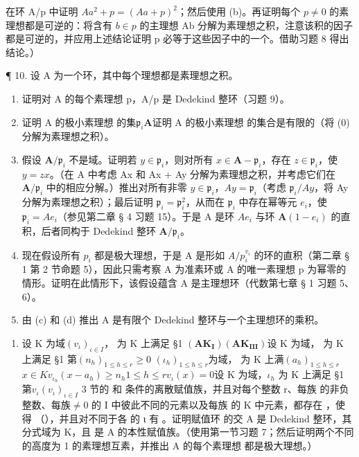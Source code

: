 在环 A/p 中证明 \(Aa^{2} + p = (Aa + p)^{2}\)；然后使用 (b)。再证明每个 \(p \neq 0\) 的素理想都是可逆的：将含有 \(b \in p\) 的主理想 Ab 分解为素理想之积，注意该积的因子都是可逆的，并应用上述结论证明 p 必等于这些因子中的一个。借助习题 8 得出结论。）

¶ 10. 设 A 为一个环，其中每个理想都是素理想之积。

\begin{enumerate}
\def\labelenumi{(\alph{enumi})}
\item
  证明对 A 的每个素理想 p，A/p 是 Dedekind 整环（习题 9）。
\item
  证明 A 的极小素理想  的集\(\mathfrak{p}_i\)\(\mathbf{A}\)证明 A 的极小素理想  的集合是有限的（将 (0) 分解为素理想之积）。
\item
  假设 \(\mathbf{A} / \mathfrak{p}_i\) 不是域。证明若 \(y \in \mathfrak{p}_i\)，则对所有 \(x \in \mathbf{A} - \mathfrak{p}_i\)，存在 \(z \in \mathfrak{p}_i\)，使 \(y = zx\)。（在 A 中考虑 Ax 和 Ax + Ay 分解为素理想之积，并考虑它们在 \(\mathbf{A} / \mathfrak{p}_i\) 中的相应分解。）推出对所有非零 \(y \in \mathfrak{p}_i\)，\(Ay = \mathfrak{p}_i\)（考虑 \(\mathfrak{p}_i / Ay\)，将 Ay 分解为素理想之积）；最后证明 \(\mathfrak{p}_i = \mathfrak{p}_i^2\)，从而在 \(\mathfrak{p}_i\) 中存在幂等元 \(e_i\)，使 \(\mathfrak{p}_i = Ae_i\)（参见第二章 § 4 习题 15）。于是 A 是环 \(Ae_i\) 与环 \(\mathbf{A}(1 - e_i)\) 的直积，后者同构于 Dedekind 整环 \(\mathbf{A} / \mathfrak{p}_i\)。
\item
  现在假设所有 \(p_{i}\) 都是极大理想，于是 A 是形如 \(A/p_{i}^{v_{i}}\) 的环的直积（第二章 § 1 第 2 节命题 5），因此只需考察 A 为准素环或 A 的唯一素理想 p 为幂零的情形。证明在此情形下，该假设蕴含 A 是主理想环（代数第七章 § 1 习题 5、6）。
\item
  由 (c) 和 (d) 推出 A 是有限个 Dedekind 整环与一个主理想环的乘积。
\end{enumerate}

\begin{enumerate}
\def\labelenumi{\arabic{enumi}.}
\setcounter{enumi}{10}
\tightlist
\item
  设 K 为域\((v_{\iota})_{\iota\in I}\)， 为 K 上满足 §1 \((\mathbf{AK}_{\mathbf{I}})\)\((\mathbf{AK}_{\mathbf{III}})\)设 K 为域， 为 K 上满足 §1 第\((n_{h})_{1\leqslant h\leqslant r}\)\(\geqslant0\) \((\iota_{h})_{1\leqslant h\leqslant r}\)为域， 为 K 上满\((a_{h})_{1\leqslant h\leqslant r}\)\(x\in K\)\(v_{\iota_{h}}(x-a_{h})\geqslant n_{h}\)\(1\leqslant h\leqslant r\)\(v_{\iota}(x)=0\)设 K 为域，\(\iota_{h}\) 为 K 上满足 §1 第\(v_{\iota}\)\((v_{\iota})_{\iota\in I}\) 3 节的  和  条件的离散赋值族，并且对每个整数 r、每族  的非负整数、每族\(\neq0\)  的 I 中彼此不同的元素以及每族  的 K 中元素，都存在 ，使得 （），并且对不同于各  的 ι 有 。证明赋值环  的交 A 是 Dedekind 整环，其分式域为 K，且  是 A 的本性赋值族。（使用第一节习题 7；然后证明两个不同的高度为 1 的素理想互素，并推出 A 的每个素理想  都是极大理想。）
\end{enumerate}

